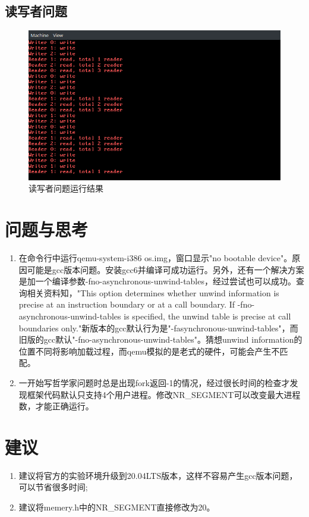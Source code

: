 \documentclass[12pt,a4paper,UTF8]{article}
\begin{document}
\subsection{读写者问题}
\begin{figure}[htbp]
	\centering
	\includegraphics[width=\textwidth]{reader}
	\caption{读写者问题运行结果}
\end{figure}

\section{问题与思考}
\begin{enumerate}
	\item 在命令行中运行qemu-system-i386 os.img，窗口显示"no bootable device"。原因可能是gcc版本问题。安装gcc6并编译可成功运行。另外，还有一个解决方案是加一个编译参数-fno-asynchronous-unwind-tables，经过尝试也可以成功。查询相关资料知，"This option determines whether unwind information is precise at an instruction boundary or at a call boundary. If -fno-asynchronous-unwind-tables is specified, the unwind table is precise at call boundaries only."新版本的gcc默认行为是"-fasynchronous-unwind-tables"，而旧版的gcc默认"-fno-asynchronous-unwind-tables"。猜想unwind information的位置不同将影响加载过程，而qemu模拟的是老式的硬件，可能会产生不匹配。
	\item 一开始写哲学家问题时总是出现fork返回-1的情况，经过很长时间的检查才发现框架代码默认只支持4个用户进程。修改NR\_SEGMENT可以改变最大进程数，才能正确运行。
\end{enumerate}

\section{建议}
\begin{enumerate}
	\item 建议将官方的实验环境升级到20.04LTS版本，这样不容易产生gcc版本问题，可以节省很多时间;
	\item 建议将memery.h中的NR\_SEGMENT直接修改为20。
\end{enumerate}
\end{document}
